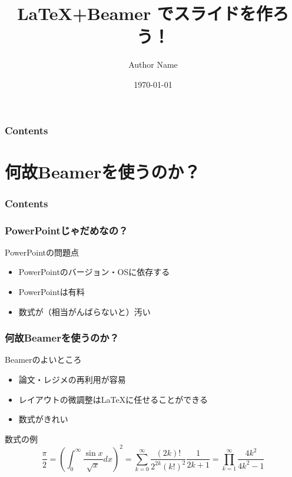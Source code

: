 \documentclass[dvipdfmx,11pt,notheorems]{beamer}
\title[略タイトル]{\LaTeX +Beamer でスライドを作ろう！}%
\author[Author]{Author Name}%
\institute[JPN]{Tokyo, Japan}%
\date{\today}%
\theoremstyle{definition}
\begin{document}
\begin{frame}[plain]\frametitle{}
\titlepage %
\end{frame}

\begin{frame}\frametitle{Contents}
\tableofcontents %
\end{frame}

\section{何故Beamerを使うのか？}
  \begin{frame}\frametitle{Contents}
    \tableofcontents[currentsection] %
  \end{frame}

  \begin{frame}\frametitle{PowerPointじゃだめなの？}
  \begin{alertblock}{PowerPointの問題点}
  \begin{itemize}
  \item PowerPointのバージョン・OSに依存する 
  \item PowerPointは有料
  \item 数式が（相当がんばらないと）汚い 
  \end{itemize}
  \end{alertblock}
  \end{frame}

  \begin{frame}\frametitle{何故Beamerを使うのか？}
    \begin{block}{Beamerのよいところ}
    \begin{itemize}
    \item 論文・レジメの再利用が容易 
    \item レイアウトの微調整は\LaTeX に任せることができる 
    \item 数式がきれい 
    \end{itemize}
    \end{block}

    \begin{exampleblock}{数式の例} 
    \begin{equation*}
    \frac{\pi}{2} =\left( \int_{0}^{\infty} \frac{\sin x}{\sqrt{x}} dx \right)^2 =\sum_{k=0}^{\infty} \frac{(2k)!}{2^{2k}(k!)^2} \frac{1}{2k+1} 
    =\prod_{k=1}^{\infty} \frac{4k^2}{4k^2 - 1}
    \end{equation*}
    \end{exampleblock}
  \end{frame}
\end{document}
